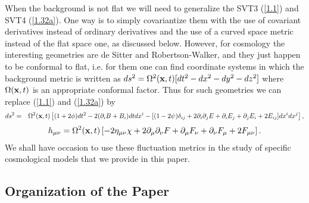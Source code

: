 \documentclass[aps,onecolumn,10pt]{revtex4}
\numberwithin{equation}{section}
\numberwithin{equation}{section}
\begin{document}
When the background is not flat we will need to generalize the SVT3 (\ref{1.1}) and SVT4 (\ref{1.32a}). One way  is to simply covariantize them with the use of covariant derivatives instead of ordinary derivatives and the use of a curved space metric instead of the flat space one, as discussed below. However, for cosmology the interesting geometries are de Sitter and Robertson-Walker, and they just happen to be conformal to flat, i.e. for them one can find coordinate systems in which the background metric is written as $ds^2=\Omega^2({\bf x},t)[dt^2-dx^2-dy^2-dz^2]$ where $\Omega ({\bf x},t)$ is an appropriate conformal factor. Thus for such geometries we can replace (\ref{1.1}) and (\ref{1.32a}) by 
%
\begin{eqnarray}
ds^2 &=&\Omega^2({\bf x},t)\left[(1+2\phi) dt^2 -2(\partial_i B +B_i)dt dx^i - [(1-2\psi)\delta_{ij} +2\partial_i\partial_j E + \partial_i E_j + \partial_j E_i + 2E_{ij}]dx^i dx^j\right],
\label{1.42a}
\end{eqnarray}
%
%
\begin{eqnarray}
h_{\mu\nu}=\Omega^2({\bf x},t)\left[-2\eta_{\mu\nu}\chi+2\partial_{\mu}\partial_{\nu}F
+ \partial_{\mu}F_{\nu}+\partial_{\nu}F_{\mu}+2F_{\mu\nu}\right].
\label{1.43a}
\end{eqnarray}
%
We shall have occasion to use these fluctuation metrics in the study of specific cosmological models that we provide in this paper.

\subsection{Organization of the Paper}
\label{S1f}
\end{document}
